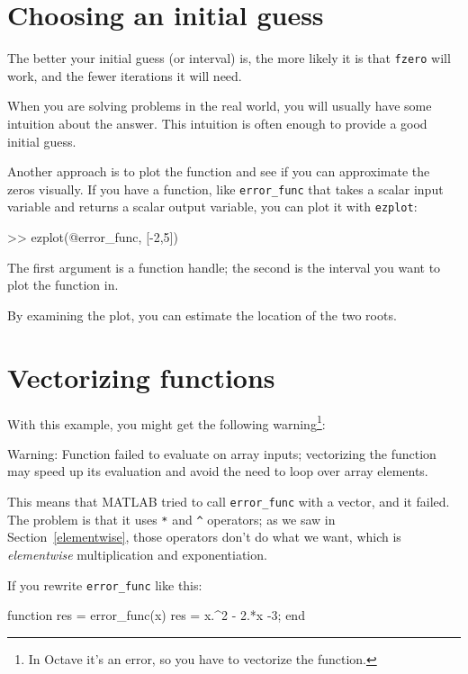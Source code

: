 \documentclass[
]{book}
\numberwithin{Answer}{chapter}
\numberwithin{Exercise}{chapter}
\begin{document}
\section{Choosing an initial guess}

The better your initial guess (or interval) is, the more likely
it is that {\tt fzero} will work, and the fewer iterations it will
need.

When you are solving problems in the real world, you will usually
have some intuition about the answer.  This intuition is often enough
to provide a good initial guess.

Another approach is to plot the function and see if you can
approximate the zeros visually.  If you have a function, like
{\tt error\_func} that takes a scalar input variable and returns
a scalar output variable, you can plot it with {\tt ezplot}:

\begin{code}
>> ezplot(@error_func, [-2,5])
\end{code}


The first argument is a function handle; the second is the interval you want to plot the function in.

By examining the plot, you can estimate the location of the two roots.


\section{Vectorizing functions}

With this example, you might get the following warning\footnote{In Octave it's an error, so you have to vectorize the function.}:

\begin{code}
Warning: Function failed to evaluate on array inputs;
vectorizing the function may speed up its evaluation and 
avoid the need to loop over array elements. 
\end{code}

This means that MATLAB tried to call \verb"error_func" with a vector, and it failed. 
The problem is that it uses \verb"*" and \verb"^" operators; as we saw in Section~\ref{elementwise}, those operators don't do what we want, which is {\em elementwise} multiplication and exponentiation.

If you rewrite \verb"error_func" like this:

\begin{code}
function res = error_func(x)
    res = x.^2 - 2.*x -3;
end
\end{code}
\end{document}
